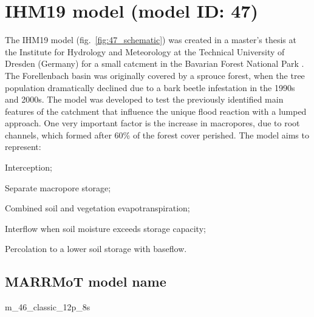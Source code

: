 \section{IHM19 model (model ID: 47)}
The IHM19 model (fig.~\ref{fig:47_schematic}) was created in a master's thesis at the Institute for Hydrology and Meteorology at the Technical University of Dresden (Germany) for a small catcment in the Bavarian Forest National Park \citep{Brandes2020}. The Forellenbach basin was originally covered by a sprouce forest, when the tree population dramatically declined due to a bark beetle infestation in the 1990s and 2000s. The model was developed to test the previously identified main features of the catchment that influence the unique flood reaction with a lumped approach. One very important factor is the increase in macropores, due to root channels, which formed after 60\% of the forest cover perished.
The model aims to represent:
\begin{itemizecompact}
\item Interception;
\item Separate macropore storage;
\item Combined soil and vegetation evapotranspiration;
\item Interflow when soil moisture exceeds storage capacity;
\item Percolation to a lower soil storage with baseflow.
\end{itemizecompact}

\subsection{MARRMoT model name}
m\_46\_classic\_12p\_8s \\

